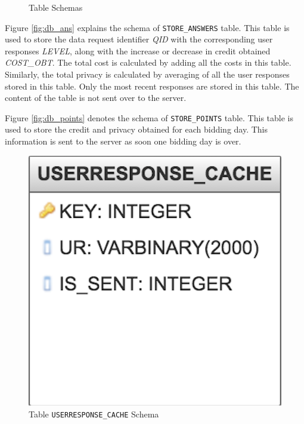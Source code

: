 \begin{figure}[htp]
 \hspace{1em}
\caption{Table Schemas}
\label{fig:ts11}
\end{figure}

Figure \ref{fig:db_ans} explains the schema of \texttt{STORE\_ANSWERS} table. This table is used to store the data request identifier \textit{QID} with the corresponding
user responses \textit{LEVEL}, along with the increase or decrease in credit obtained \textit{COST\_OBT}. The total cost is calculated by adding all the costs in this table. Similarly, the total privacy is calculated by averaging of all the user responses stored in this table. Only the most recent responses are stored in this table. The content of the table is not sent over to the server.

Figure \ref{fig:db_points} denotes the schema of \texttt{STORE\_POINTS} table. This table is used to store the credit and privacy obtained for each bidding day.
This information is sent to the server as soon one bidding day is over.

\begin{figure}[ht!]
\centering
\includegraphics[width=0.4\linewidth]{./images/db_ur}
\caption{Table \texttt{USERRESPONSE\_CACHE} Schema}
\label{fig:db_ur}
\end{figure}

